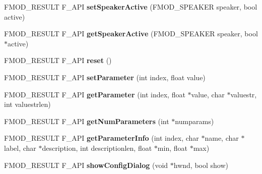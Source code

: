 \begin{DoxyCompactItemize}
\item 
F\+M\+O\+D\+\_\+\+R\+E\+S\+U\+LT F\+\_\+\+A\+PI {\bfseries set\+Speaker\+Active} (F\+M\+O\+D\+\_\+\+S\+P\+E\+A\+K\+ER speaker, bool active)\hypertarget{class_f_m_o_d_1_1_d_s_p_ac8b9504840c96548c383fdead268f10c}{}\label{class_f_m_o_d_1_1_d_s_p_ac8b9504840c96548c383fdead268f10c}

\item 
F\+M\+O\+D\+\_\+\+R\+E\+S\+U\+LT F\+\_\+\+A\+PI {\bfseries get\+Speaker\+Active} (F\+M\+O\+D\+\_\+\+S\+P\+E\+A\+K\+ER speaker, bool $\ast$active)\hypertarget{class_f_m_o_d_1_1_d_s_p_ace16e6d02305b7d39cb626abb944d054}{}\label{class_f_m_o_d_1_1_d_s_p_ace16e6d02305b7d39cb626abb944d054}

\item 
F\+M\+O\+D\+\_\+\+R\+E\+S\+U\+LT F\+\_\+\+A\+PI {\bfseries reset} ()\hypertarget{class_f_m_o_d_1_1_d_s_p_ae475150cbc68d5ad5e5be5791ec3961a}{}\label{class_f_m_o_d_1_1_d_s_p_ae475150cbc68d5ad5e5be5791ec3961a}

\item 
F\+M\+O\+D\+\_\+\+R\+E\+S\+U\+LT F\+\_\+\+A\+PI {\bfseries set\+Parameter} (int index, float value)\hypertarget{class_f_m_o_d_1_1_d_s_p_abb8a3ad932d399703103da1b752c4fad}{}\label{class_f_m_o_d_1_1_d_s_p_abb8a3ad932d399703103da1b752c4fad}

\item 
F\+M\+O\+D\+\_\+\+R\+E\+S\+U\+LT F\+\_\+\+A\+PI {\bfseries get\+Parameter} (int index, float $\ast$value, char $\ast$valuestr, int valuestrlen)\hypertarget{class_f_m_o_d_1_1_d_s_p_aae915b3c0d956419aeed08c2aa3000e2}{}\label{class_f_m_o_d_1_1_d_s_p_aae915b3c0d956419aeed08c2aa3000e2}

\item 
F\+M\+O\+D\+\_\+\+R\+E\+S\+U\+LT F\+\_\+\+A\+PI {\bfseries get\+Num\+Parameters} (int $\ast$numparams)\hypertarget{class_f_m_o_d_1_1_d_s_p_aba45842920caedf11c614d77aa028ab3}{}\label{class_f_m_o_d_1_1_d_s_p_aba45842920caedf11c614d77aa028ab3}

\item 
F\+M\+O\+D\+\_\+\+R\+E\+S\+U\+LT F\+\_\+\+A\+PI {\bfseries get\+Parameter\+Info} (int index, char $\ast$name, char $\ast$label, char $\ast$description, int descriptionlen, float $\ast$min, float $\ast$max)\hypertarget{class_f_m_o_d_1_1_d_s_p_a116d65e165bac32512ddbb7c188bf3a5}{}\label{class_f_m_o_d_1_1_d_s_p_a116d65e165bac32512ddbb7c188bf3a5}

\item 
F\+M\+O\+D\+\_\+\+R\+E\+S\+U\+LT F\+\_\+\+A\+PI {\bfseries show\+Config\+Dialog} (void $\ast$hwnd, bool show)\hypertarget{class_f_m_o_d_1_1_d_s_p_a9a77cb36dbbc0bb053b42eb4d2dcd1f7}{}\label{class_f_m_o_d_1_1_d_s_p_a9a77cb36dbbc0bb053b42eb4d2dcd1f7}


\end{DoxyCompactItemize}
